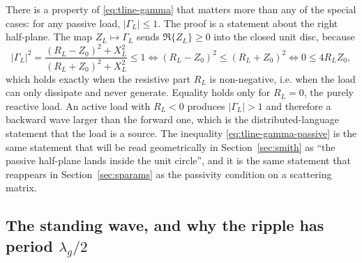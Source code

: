 There is a property of \eqref{eq:tline-gamma} that matters more than any of the special cases: for any passive
load, $|\Gamma_L|\le 1$. The proof is a statement about the right half-plane. The map $Z_L\mapsto\Gamma_L$ sends
$\Re\{Z_L\}\ge 0$ into the closed unit disc, because
\begin{equation}
  |\Gamma_L|^2 = \frac{(R_L-Z_0)^2 + X_L^2}{(R_L+Z_0)^2 + X_L^2} \le 1
  \iff (R_L-Z_0)^2 \le (R_L+Z_0)^2 \iff 0 \le 4 R_L Z_0 ,
  \label{eq:tline-gamma-passive}
\end{equation}
which holds exactly when the resistive part $R_L$ is non-negative, i.e. when the load can only dissipate and
never generate. Equality holds only for $R_L=0$, the purely reactive load. An active load with $R_L<0$ produces
$|\Gamma_L|>1$ and therefore a backward wave larger than the forward one, which is the distributed-language
statement that the load is a source. The inequality \eqref{eq:tline-gamma-passive} is the same statement that
will be read geometrically in Section~\ref{sec:smith} as ``the passive half-plane lands inside the unit circle'',
and it is the same statement that reappears in Section~\ref{sec:sparams} as the passivity condition on a
scattering matrix.

\subsection{The standing wave, and why the ripple has period $\lambda_g/2$}
\label{sec:tline-ripple}

